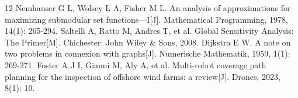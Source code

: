 \documentclass[12pt,a4paper]{ctexart}
\begin{document}
\begin{thebibliography}{12}
 Nemhauser G L, Wolsey L A, Fisher M L. An analysis of approximations for maximizing submodular set functions---I[J]. Mathematical Programming, 1978, 14(1): 265-294.
 Saltelli A, Ratto M, Andres T, et al. Global Sensitivity Analysis: The Primer[M]. Chichester: John Wiley \& Sons, 2008.
 Dijkstra E W. A note on two problems in connexion with graphs[J]. Numerische Mathematik, 1959, 1(1): 269-271.
 Foster A J I, Gianni M, Aly A, et al. Multi-robot coverage path planning for the inspection of offshore wind farms: a review[J]. Drones, 2023, 8(1): 10.
\end{thebibliography}


\end{document}
